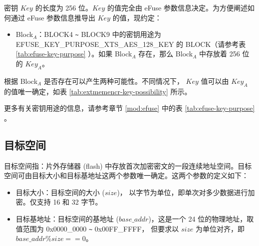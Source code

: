 \documentclass[main\_\_CN.tex]{subfiles}
\begin{document}
密钥 \begin{math}Key\end{math} 的长度为 256 位。\begin{math}Key\end{math} 的值完全由 eFuse 参数信息决定。为方便阐述如何通过 eFuse 参数信息推导出  \begin{math}Key\end{math} 的值，现约定：
\begin{itemize}
    \item Block$_A$：BLOCK4 \verb+~+ BLOCK9 中的密钥用途为 EFUSE\_KEY\_PURPOSE\_XTS\_AES\_128\_KEY 的 BLOCK（请参考表 \ref{tab:efuse-key-purpose} \textit{}）。如果 Block$_A$ 存在，那么 Block$_A$ 中存放着 256 位的 \begin{math}Key_{A}\end{math}。
\end{itemize}

根据 Block$_A$ 是否存在可以产生两种可能性。不同情况下， \begin{math}Key\end{math} 值可以由 \begin{math}Key_{A}\end{math} 的值唯一确定，如表 \ref{tab:extmemencr-key-possibility} 所示。



更多有关密钥用途的信息，请参考章节 \ref{mod:efuse} \textit{} 中的表 \ref{tab:efuse-key-purpose} \textit{}。

\subsection{目标空间} 
\label{sec:extmemencr-target-space}

目标空间指：片外存储器 (flash) 中存放首次加密密文的一段连续地址空间。目标空间可由目标大小和目标基地址这两个参数唯一确定。这两个参数的定义如下：

\begin{itemize}
    \item 目标大小：目标空间的大小 (\begin{math} size \end{math})， 以字节为单位，即单次对多少数据进行加密。仅支持 16 和 32 字节。
    \item 目标基地址：目标空间的基地址 (\begin{math} base\_addr\end{math})，这是一个 24 位的物理地址，取值范围为 0x0000\_0000 \verb+~+ 0x00FF\_FFFF， 但要求以 \begin{math} size \end{math} 为单位对齐，即 \begin{math} base\_addr \% size == 0 \end{math}。
\end{itemize}
\end{document}

